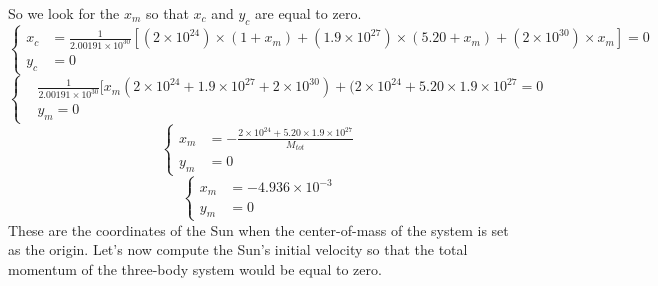 \documentclass[a4paper, twoside, 11pt]{report}
\theoremstyle{theorem}
\theoremstyle{remark}
\theoremstyle{exemple}
\begin{document}
            So we look for the $x_m$ so that $x_c$ and $y_c$ are equal to zero.
                \begin{equation*}
                    \left\{
                        \begin{aligned}
                            x_c &= \frac{1}{2.00191 \times 10^{30}} [(2 \times 10^{24}) \times (1 + x_m) + (1.9 \times 10^{27}) \times (5.20 + x_m) + (2 \times 10^{30}) \times x_m] = 0 \\
                            y_c &= 0 
                        \end{aligned}
                    \right.
                \end{equation*}
                \begin{equation*}
                    \left\{
                        \begin{aligned}
                            &\frac{1}{2.00191\times 10^{30}}[x_m (2\times10^{24} + 1.9\times10^{27} + 2\times 10^{30}) + (2\times10^{24} + 5.20 \times 1.9 \times 10^{27} = 0 \\
                            &y_m = 0
                        \end{aligned}
                    \right.
                \end{equation*}
                \begin{equation*}
                    \left\{
                        \begin{aligned}
                            x_m &= -\frac{2\times 10^{24} + 5.20 \times 1.9 \times 10^{27}}{M_{tot}}\\
                            y_m &= 0
                        \end{aligned}
                    \right.
                \end{equation*}
                \begin{equation*}
                    \left\{
                        \begin{aligned}
                            x_m &= -4.936 \times 10^{-3}\\
                            y_m &= 0
                        \end{aligned}
                    \right.
                    \tag{5}
                \end{equation*}
            These are the coordinates of the Sun when the center-of-mass of the system is set as the origin. Let's now compute the Sun's initial velocity so that the total momentum of the three-body system would be equal to zero.
\end{document}
